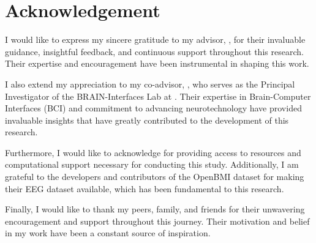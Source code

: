 \chapter*{Acknowledgement}
\label{chap:acknowledgement}

I would like to express my sincere gratitude to my advisor, \srsAdvisorName, for their invaluable guidance, insightful feedback, and continuous support throughout this research. Their expertise and encouragement have been instrumental in shaping this work.

I also extend my appreciation to my co-advisor, \srsCoAdvisorName, who serves as the Principal Investigator of the BRAIN-Interfaces Lab at \srsInstitutionName. Their expertise in Brain-Computer Interfaces (BCI) and commitment to advancing neurotechnology have provided invaluable insights that have greatly contributed to the development of this research.

Furthermore, I would like to acknowledge \srsInstitutionName for providing access to resources and computational support necessary for conducting this study. Additionally, I am grateful to the developers and contributors of the OpenBMI dataset for making their EEG dataset available, which has been fundamental to this research.

Finally, I would like to thank my peers, family, and friends for their unwavering encouragement and support throughout this journey. Their motivation and belief in my work have been a constant source of inspiration.


\vspace{.2in}
\begin{flushright}
    \usevar{\srsAuthorOne} \\
    \usevar{\srsAuthorTwo} \\
    \usevar{\srsAuthorThree}
\end{flushright}